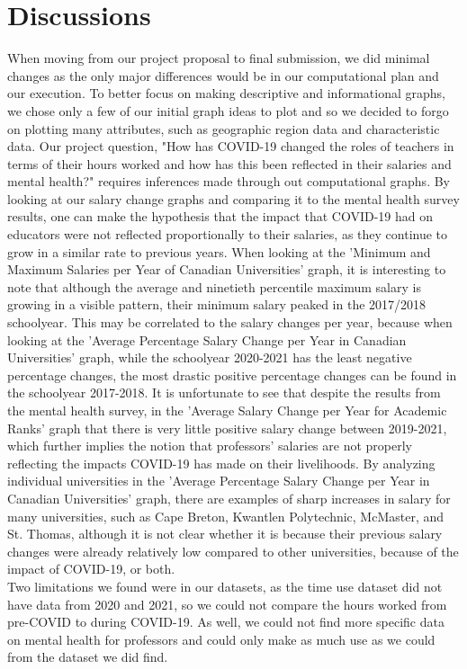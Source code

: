 \documentclass{article}
\begin{document}
\section{Discussions}
When moving from our project proposal to final submission, we did minimal changes as the only major differences would be in our computational plan and our execution. To better focus on making descriptive and informational graphs, we chose only a few of our initial graph ideas to plot and so we decided to forgo on plotting many attributes, such as geographic region data and characteristic data.
\hfill \break
Our project question, "How has COVID-19 changed the roles of teachers in terms of their hours worked and how has this been reflected in their salaries and mental health?" requires inferences made through out computational graphs. By looking at our salary change graphs and comparing it to the mental health survey results, one can make the hypothesis that the impact that COVID-19 had on educators were not reflected proportionally to their salaries, as they continue to grow in a similar rate to previous years. When looking at the 'Minimum and Maximum Salaries per Year of Canadian Universities' graph, it is interesting to note that although the average and ninetieth percentile maximum salary is growing in a visible pattern, their minimum salary peaked in the 2017/2018 schoolyear. This may be correlated to the salary changes per year, because when looking at the 'Average Percentage Salary Change per Year in Canadian Universities' graph, while the schoolyear 2020-2021 has the least negative percentage changes, the most drastic positive percentage changes can be found in the schoolyear 2017-2018. It is unfortunate to see that despite the results from the mental health survey, in the 'Average Salary Change per Year for Academic Ranks' graph that there is very little positive salary change between 2019-2021, which further implies the notion that professors' salaries are not properly reflecting the impacts COVID-19 has made on their livelihoods. By analyzing individual universities in the 'Average Percentage Salary Change per Year in Canadian Universities' graph, there are examples of sharp increases in salary for many universities, such as Cape Breton, Kwantlen Polytechnic, McMaster, and St. Thomas, although it is not clear whether it is because their previous salary changes were already relatively low compared to other universities, because of the impact of COVID-19, or both.\\
Two limitations we found were in our datasets, as the time use dataset did not have data from 2020 and 2021, so we could not compare the hours worked from pre-COVID to during COVID-19. As well, we could not find more specific data on mental health for professors and could only make as much use as we could from the dataset we did find.\\
\end{document}
